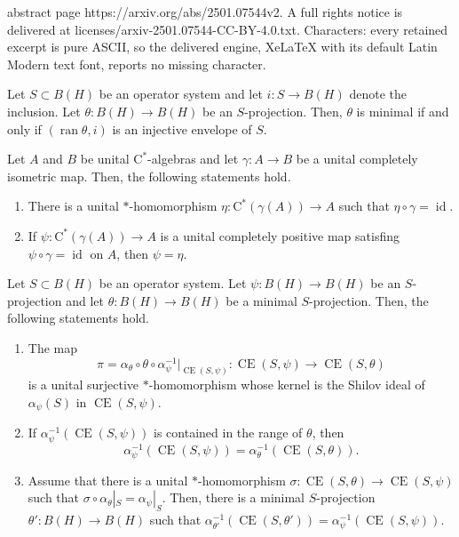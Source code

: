 \documentclass[10pt,a4paper]{amsart}
\newcommand{\CE}{\operatorname{CE}}
\newcommand{\id}{\operatorname{id}}
\newcommand{\rC}{\mathrm{C}}
\newcommand{\ran}{\operatorname{ran}}
\begin{document}
abstract page https://arxiv.org/abs/2501.07544v2. A full rights notice is delivered at licenses/arxiv-2501.07544-CC-BY-4.0.txt. Characters: every retained excerpt is pure ASCII, so the delivered engine, XeLaTeX with its default Latin Modern text font, reports no missing character.
\begin{theorem}\label{T:Hamana}
Let $S\subset B(H)$ be an operator system and let $i:S\to B(H)$ denote the inclusion. Let $\theta:B(H)\to B(H)$ be an $S$-projection. Then, $\theta$ is minimal if and only if $( \ran \theta, i)$ is an injective envelope of $S$.   
\end{theorem}

\begin{proposition}\label{P:CEtrik}
Let $A$ and $B$ be unital $\rC^*$-algebras and let $\gamma:A\to B$ be a unital completely isometric map. Then, the following statements hold.
\begin{enumerate}[{\rm (i)}]
\item There is a unital $*$-homomorphism $\eta:\rC^*(\gamma(A))\to A$ such that $\eta\circ \gamma=\id$.
\item If  $\psi:\rC^*(\gamma(A))\to A$ is a unital completely positive map satisfing $\psi\circ \gamma=\id$ on $A$, then $\psi=\eta$. 
\end{enumerate} 
\end{proposition}

\begin{proposition}\label{P:CEcomp}
Let $S\subset B(H)$ be an operator system.  Let $\psi:B(H)\to B(H)$ be an $S$-projection and let $\theta:B(H)\to B(H)$ be a minimal $S$-projection. Then, the following statements hold.
\begin{enumerate}[{\rm(i)}]
\item The map \[\pi=\alpha_\theta\circ \theta\circ \alpha_\psi^{-1}|_{\CE(S,\psi)}: \CE(S,\psi)\to \CE(S,\theta)\] is a unital surjective $*$-homomorphism whose kernel is the Shilov ideal of $\alpha_\psi(S)$ in $\CE(S,\psi)$.
\item  If $\alpha_\psi^{-1}(\CE(S,\psi))$ is contained in the range of $\theta$, then \[\alpha_\psi^{-1}(\CE(S,\psi))=\alpha_\theta^{-1}( \CE(S,\theta)).\]
\item Assume that there is a unital $*$-homomorphism $\sigma:\CE(S,\theta)\to \CE(S,\psi)$ such that $\sigma\circ\alpha_\theta|_S=\alpha_\psi|_S$. Then, there is a minimal $S$-projection $\theta':B(H)\to B(H)$ such that $\alpha_{\theta'}^{-1}(\CE(S,\theta'))=\alpha_\psi^{-1}(\CE(S,\psi))$. 
\end{enumerate}
\end{proposition}
\end{document}
